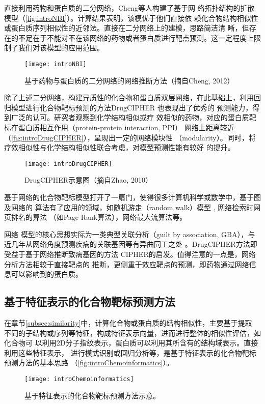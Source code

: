 直接利用药物和蛋白质的二分网络，Cheng等人\cite{cheng2012prediction}构建了基于网
络拓扑结构的扩散模型（\autoref{fig:introNBI}）。计算结果表明，该模优于他们直接依
赖化合物结构相似性或蛋白质序列相似性的近邻法。直接在二分网络上的建模，思路简洁清
晰，但存在的不足在于不能对不在该网络的药物或者蛋白质进行靶点预测。这一定程度上限
制了我们对该模型的应用范围。
\begin{figure}[htb]
  \centering
  \texttt{[image: introNBI]}
  \caption{基于药物与蛋白质的二分网络的网络推断方法（摘自Cheng, 2012）\cite{cheng2013prediction}}
  \label{fig:introNBI}
\end{figure}

除了上述二分网络，构建异质性的化合物和蛋白质双层网络，在此基础上，利用回
归模型进行化合物靶标预测的方法DrugCIPHER\cite{zhao2010network} 也表现出了优秀的
预测能力，得到广泛的认可\cite{barabasi2011network}。研究者观察到化学结构相似或疗
效相似的药物，对应的蛋白质靶标在蛋白质相互作用（protein-protein interaction, PPI）
网络上距离较近（\autoref{fig:introDrugCIPHER}），呈现出一定的网络模块性
（modularity）。同时，将疗效相似性与化学结构相似性联合考虑，对模型预测性能有较好
的提升。
\begin{figure}[htb]
  \centering
  \texttt{[image: introDrugCIPHER]}
  \caption{DrugCIPHER示意图（摘自Zhao, 2010）\cite{zhao2010network}}
  \label{fig:introDrugCIPHER}
\end{figure}

基于网络的化合物靶标模型打开了一扇门，使得很多计算机科学或数学中，基于图及网络的
算法有了应用的领域，如随机游走（random walk）模型
\cite{seal2015optimizing,yao2011modularity}, 网络检索时网页排名的算法
\cite{zhang2015drug}（如Page Rank算法），网络最大流算法\cite{chen2011uncover}等。

网络
模型的核心思想实际为一类典型关联分析\cite{wang2014drug}（guilt by association,
GBA），与近几年从网络角度预测疾病的关联基因等有异曲同工之处
\cite{lee2011prioritizing}。DrugCIPHER方法即受益于基于网络推断致病基因的方法
CIPHER\cite{wu2008network}的启发。值得注意的一点是，网络分析方法相较于直接靶点的
推断，更侧重于效应靶点的预测，即药物通过网络信息可以影响到的蛋白质。
\subsection{基于特征表示的化合物靶标预测方法}
在章节\ref{subsec:similarity}中，计算化合物或蛋白质的结构相似性，主要基于提取
不同的子结构或序列等特征，构成特征表示向量，进而进行整体的相似性评估，如化合物可
以利用2D分子指纹表示，蛋白质可以利用其所含有的结构域表示。直接利用这些特征表示，
进行模式识别或回归分析等，是基于特征表示的化合物靶标预测方法的基本思路
（\autoref{fig:introChemoinformatics}）。
\begin{figure}[htb]
  \centering
  \texttt{[image: introChemoinformatics]}
  \caption{基于特征表示的化合物靶标预测方法示意。}
  \label{fig:introChemoinformatics}
\end{figure}

